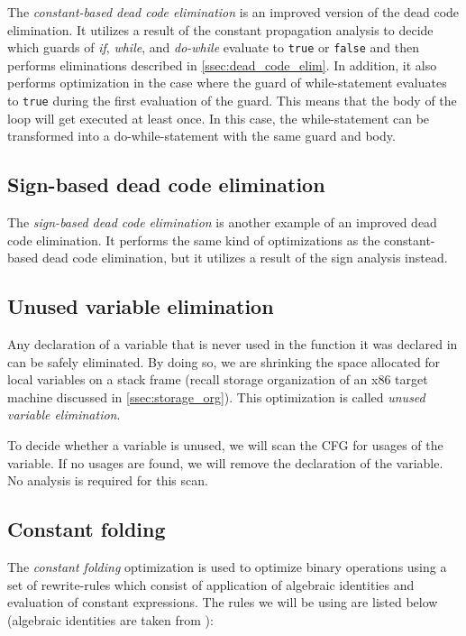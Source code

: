 \documentclass[thesis=M,english]{FITthesis}[2019/12/23]
\begin{document}
The \emph{constant-based dead code elimination} is an improved version of the dead code elimination. It utilizes a result of the constant propagation analysis to decide which guards of \emph{if}, \emph{while}, and \emph{do-while} evaluate to \texttt{true} or \texttt{false} and then performs eliminations described in \autoref{ssec:dead_code_elim}. In addition, it also performs optimization in the case where the guard of while-statement evaluates to \texttt{true} during the first evaluation of the guard. This means that the body of the loop will get executed at least once. In this case, the while-statement can be transformed into a do-while-statement with the same guard and body.

\subsection{Sign-based dead code elimination}
The \emph{sign-based dead code elimination} is another example of an improved dead code elimination. It performs the same kind of optimizations as the constant-based dead code elimination, but it utilizes a result of the sign analysis instead.

\subsection{Unused variable elimination}
Any declaration of a variable that is never used in the function it was declared in can be safely eliminated. By doing so, we are shrinking the space allocated for local variables on a stack frame (recall storage organization of an x86 target machine discussed in \autoref{ssec:storage_org}). This optimization is called \emph{unused variable elimination}.

To decide whether a variable is unused, we will scan the CFG for usages of the variable. If no usages are found, we will remove the declaration of the variable. No analysis is required for this scan.

\subsection{Constant folding}
The \emph{constant folding} optimization is used to optimize binary operations using a set of rewrite-rules which consist of application of algebraic identities and evaluation of constant expressions. The rules we will be using are listed below (algebraic identities are taken from \cite[Chap. 8.5.4]{dragonbook}):
\end{document}
